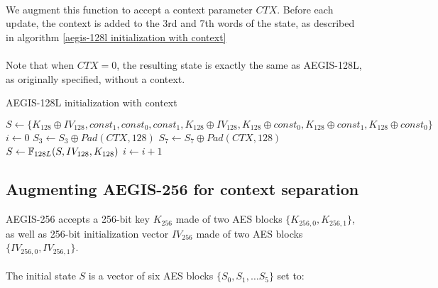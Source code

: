 \documentclass[envcountsame,runningheads,notitlepage]{llncs}
\begin{document}
\paragraph{}

We augment this function to accept a context parameter $CTX$.
Before each update, the context is added to the 3rd and 7th words of the state, as described in algorithm \ref{aegis-128l initialization with context}

\paragraph{}

Note that when $CTX = 0$, the resulting state is exactly the same as AEGIS-128L, as originally specified, without a context.

\begin{algorithm}
  \caption{AEGIS-128L initialization with context}
  \label{aegis-128l initialization with context}
  \begin{algorithmic}
    \State $S \gets \{ K_{128} \oplus IV_{128}, const_1, const_0, const_1, K_{128} \oplus IV_{128}, K_{128} \oplus const_0, K_{128} \oplus const_1, K_{128} \oplus const_0 \}$
    \State $i \gets 0$
    \State $S_3 \gets S_3 \oplus Pad(CTX, 128)$
    \State $S_7 \gets S_7 \oplus Pad(CTX, 128)$
    \State $S \gets \mathbb{F}_{128L}(S, IV_{128}, K_{128})$
    \State $i \gets i+1$
    \EndWhile
    \EndFunction
  \end{algorithmic}
\end{algorithm}

\subsection{Augmenting AEGIS-256 for context separation}
\label{sec:augmenting AEGIS-256 for context separation}

AEGIS-256 accepts a 256-bit key $K_{256}$ made of two AES blocks $\{ K_{256,0}, K_{256,1} \}$, as well as 256-bit initialization vector $IV_{256}$ made of two AES blocks $\{ IV_{256,0}, IV_{256,1} \}$.

\paragraph{}

The initial state $S$ is a vector of six AES blocks $\{S_0, S_1, \ldots S_5\}$ set to:
\end{document}
